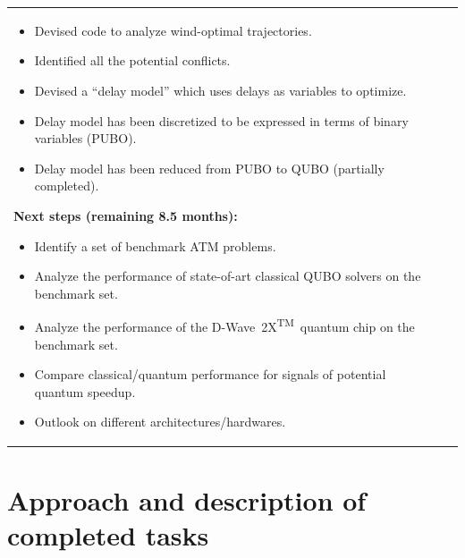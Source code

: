 \documentclass[9pt]{extarticle}
\newcommand{\DW}{\mbox{D-Wave 2X\textsuperscript{TM}}~}
\begin{document}
\begin{tabular}{p{9cm}p{0.1cm}p{8cm}}
{\begin{minipage}{8cm}
\begin{itemize}[leftmargin=0.5cm]
\itemsep-0.5em
\item Devised code to analyze wind-optimal trajectories.
\item Identified all the potential conflicts.
\item Devised a ``delay model'' which uses delays as variables to optimize.
\item Delay model has been discretized to be expressed in terms of binary variables (PUBO).
\item Delay model has been reduced from PUBO to QUBO (partially completed).
\end{itemize}

\textbf{Next steps (remaining 8.5 months):}

\begin{itemize}[leftmargin=0.5cm]
\itemsep-0.5em
\item Identify a set of benchmark ATM problems.
\item Analyze the performance of state-of-art classical QUBO solvers on the benchmark set.
\item Analyze the performance of the \DW quantum chip on the benchmark set.
\item Compare classical/quantum performance for signals of potential quantum speedup.
\item Outlook on different architectures/hardwares.
\end{itemize}

\end{minipage}
}\\
\end{tabular}


\section*{Approach and description of completed tasks}\label{sec:approach}
\end{document}
